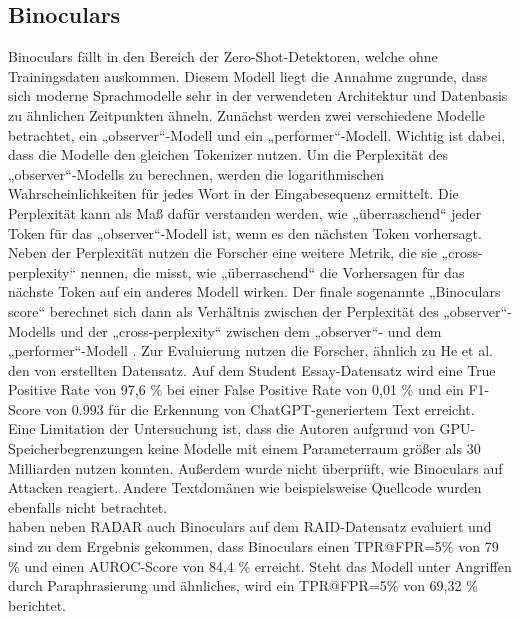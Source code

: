 \subsection{Binoculars}
\label{subsec:binoculars}
Binoculars fällt in den Bereich der Zero-Shot-Detektoren, welche ohne Trainingsdaten auskommen. Diesem Modell liegt die Annahme zugrunde, dass sich moderne Sprachmodelle sehr in der verwendeten Architektur und Datenbasis zu ähnlichen Zeitpunkten ähneln. Zunächst werden zwei verschiedene Modelle betrachtet, ein „observer“-Modell und ein „performer“-Modell. Wichtig ist dabei, dass die Modelle den gleichen Tokenizer nutzen.
Um die Perplexität des „observer“-Modells zu berechnen, werden die logarithmischen Wahrscheinlichkeiten für jedes Wort in der Eingabesequenz ermittelt. Die Perplexität kann als Maß dafür verstanden werden, wie „überraschend“ jeder Token für das „observer“-Modell ist, wenn es den nächsten Token vorhersagt. Neben der Perplexität nutzen die Forscher eine weitere Metrik, die sie „cross-perplexity“ nennen, die misst, wie „überraschend“ die Vorhersagen für das nächste Token auf ein anderes Modell wirken. Der finale sogenannte „Binoculars score“ berechnet sich dann als Verhältnis zwischen der Perplexität des „observer“-Modells und der „cross-perplexity“ zwischen dem „observer“- und dem „performer“-Modell \autocite{hans2024spottingllmsbinocularszeroshot}. Zur Evaluierung nutzen die Forscher, ähnlich zu He et al. \autocite{he2024mgtbenchbenchmarkingmachinegeneratedtext} den von \autocite{verma2024ghostbusterdetectingtextghostwritten} erstellten Datensatz. Auf dem
Student Essay-Datensatz wird eine True Positive Rate von 97,6 \% bei einer False Positive Rate von 0,01 \% und ein F1-Score von 0.993 für die Erkennung von ChatGPT-generiertem Text erreicht. \\
Eine Limitation der Untersuchung ist, dass die Autoren aufgrund von GPU-Speicherbegrenzungen keine Modelle mit einem Parameterraum größer als 30 Milliarden nutzen konnten. Außerdem wurde nicht überprüft, wie Binoculars auf Attacken reagiert. Andere Textdomänen wie beispielsweise Quellcode wurden ebenfalls nicht betrachtet. \\
\autocite{basani2026diversityboostsaigeneratedtext} haben neben RADAR auch Binoculars auf dem RAID-Datensatz evaluiert und sind zu dem Ergebnis gekommen, dass Binoculars einen TPR@FPR=5\% von 79 \% und einen AUROC-Score von 84,4 \% erreicht. Steht das Modell unter Angriffen durch Paraphrasierung und ähnliches, wird ein TPR@FPR=5\% von 69,32 \% berichtet.

